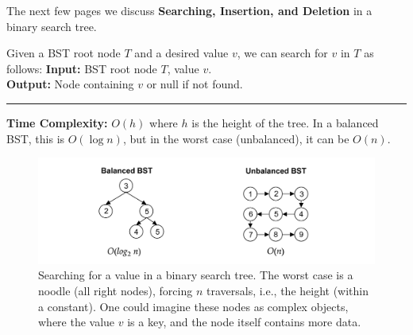 \noindent
The next few pages we discuss \textbf{Searching, Insertion, and Deletion} in a binary search tree.
  
\newpage
\begin{Func}

    Given a BST root node $T$ and a desired value $v$, we can search for $v$ in $T$ as follows:
  \newpage 
    \vspace{.5em}
    \noindent
    \textbf{Input:} BST root node $T$, value $v$.\\
    \textbf{Output:} Node containing $v$ or null if not found.
    
    \begin{algorithm}[H]
        \SetAlgoLined
    \end{algorithm}
    \noindent
    \rule{\textwidth}{0.4pt}
    \textbf{Time Complexity:} $O(h)$ where $h$ is the height of the tree. In a balanced BST, this is $O(\log n)$, but in the worst case (unbalanced), it can be $O(n)$.
\end{Func}

\begin{figure}[ht!]
    \begin{center}
    \includegraphics[width=\textwidth]{./Sections/graphs/search/bst_search.png}
    \end{center}
     \caption{Searching for a value in a binary search tree. The worst case is a noodle (all right nodes), forcing $n$ traversals, i.e., the height (within a constant). One could imagine these nodes as complex objects, where the value $v$ is a key, and the node itself contains more data.}\label{fig:bst_search}
  \end{figure}

